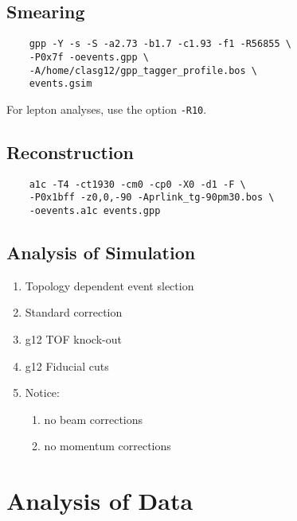 \documentclass[10pt,twocolumn,oneside,letterpaper]{article}
\begin{document}
\subsection{Smearing}

\begin{verbatim}
    gpp -Y -s -S -a2.73 -b1.7 -c1.93 -f1 -R56855 \
    -P0x7f -oevents.gpp \
    -A/home/clasg12/gpp_tagger_profile.bos \
    events.gsim
\end{verbatim}
For lepton analyses, use the option \verb|-R10|.

\subsection{Reconstruction}

\begin{verbatim}
    a1c -T4 -ct1930 -cm0 -cp0 -X0 -d1 -F \
    -P0x1bff -z0,0,-90 -Aprlink_tg-90pm30.bos \
    -oevents.a1c events.gpp
\end{verbatim}

\subsection{Analysis of Simulation}

\begin{enumerate}
    \item Topology dependent event slection
    \item Standard  correction
    \item g12 TOF knock-out
    \item g12 Fiducial cuts
    \item Notice:
    \begin{enumerate}
        \item no beam corrections
        \item no momentum corrections
    \end{enumerate}
\end{enumerate}

\section{Analysis of Data}
\end{document}
